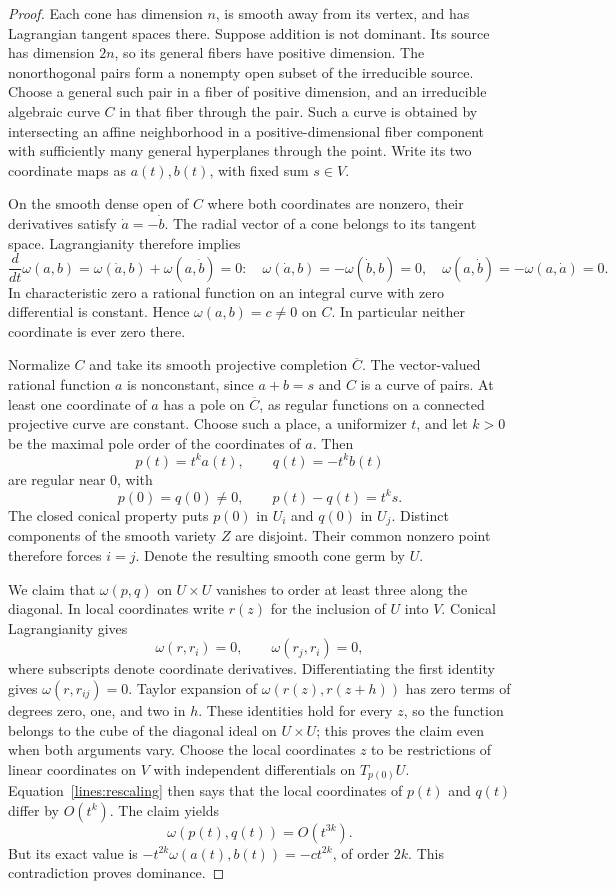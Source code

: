 \begin{proof}
Each cone has dimension $n$, is smooth away from its vertex,
and has Lagrangian tangent spaces there. Suppose addition is
not dominant. Its source has dimension $2n$, so its general
fibers have positive dimension. The nonorthogonal pairs form a
nonempty open subset of the irreducible source. Choose a general such
pair in a fiber of positive dimension, and an irreducible
algebraic curve $C$ in that fiber through the pair. Such a curve
is obtained by intersecting an affine neighborhood in a
positive-dimensional fiber component with sufficiently many
general hyperplanes through the point. Write its two coordinate
maps as $a(t),b(t)$, with fixed sum $s\in V$.

On the smooth dense open of $C$ where both coordinates are
nonzero, their derivatives satisfy $\dot a=-\dot b$.
The radial vector of a cone belongs to its tangent space.
Lagrangianity therefore implies
\[
\frac{d}{dt}\omega(a,b)
=\omega(\dot a,b)+\omega(a,\dot b)=0:
\quad \omega(\dot a,b)=-\omega(\dot b,b)=0,
\quad \omega(a,\dot b)=-\omega(a,\dot a)=0.
\]
In characteristic zero a rational function on an integral curve
with zero differential is constant. Hence $\omega(a,b)=c\neq0$
on $C$. In particular neither coordinate is ever zero there.

Normalize $C$ and take its smooth projective completion
$\overline C$. The vector-valued rational function $a$ is
nonconstant, since $a+b=s$ and $C$ is a curve of pairs. At least
one coordinate of $a$ has a pole on $\overline C$, as regular
functions on a connected projective curve are constant. Choose
such a place, a uniformizer $t$, and let $k>0$ be the maximal
pole order of the coordinates of $a$. Then
\[
p(t)=t^ka(t),\qquad q(t)=-t^kb(t)
\]
are regular near $0$, with
\begin{equation}\label{lines:rescaling}
p(0)=q(0)\neq0,\qquad p(t)-q(t)=t^ks.
\end{equation}
The closed conical property puts $p(0)$ in $U_i$ and $q(0)$ in
$U_j$. Distinct components of the smooth variety $Z$ are
disjoint. Their common nonzero point therefore forces $i=j$.
Denote the resulting smooth cone germ by $U$.

We claim that $\omega(p,q)$ on $U\times U$ vanishes to order at
least three along the diagonal. In local coordinates write
$r(z)$ for the inclusion of $U$ into $V$. Conical
Lagrangianity gives
\[
\omega(r,r_i)=0,\qquad \omega(r_j,r_i)=0,
\]
where subscripts denote coordinate derivatives. Differentiating
the first identity gives $\omega(r,r_{ij})=0$. Taylor expansion
of $\omega(r(z),r(z+h))$ has zero terms of degrees zero, one,
and two in $h$. These identities hold for every $z$, so the
function belongs to the cube of the diagonal ideal on $U\times U$;
this proves the claim even when both arguments vary.
Choose the local coordinates $z$ to be restrictions of linear
coordinates on $V$ with
independent differentials on $T_{p(0)}U$. Equation~\eqref{lines:rescaling}
then says that the local coordinates of $p(t)$ and $q(t)$ differ
by $O(t^k)$. The claim yields
\[
\omega(p(t),q(t))=O(t^{3k}).
\]
But its exact value is $-t^{2k}\omega(a(t),b(t))=-ct^{2k}$,
of order $2k$. This contradiction proves dominance.
\end{proof}

